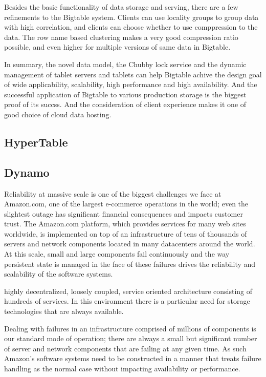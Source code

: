 \documentclass[a4paper]{article}
\begin{document}
Besides the basic functionality of data storage and serving, there are
a few refinements to the Bigtable system. Clients can use locality
groups to group data with high correlation, and clients can choose
whether to use comppression to the data. The row name based clustering
makes a very good compression ratio possible, and even higher for
multiple versions of same data in Bigtable. 

In summary, the novel data model, the Chubby lock service and the
dynamic management of tablet servers and tablets can help Bigtable
achive the design goal of wide applicability, scalability, high
performance and high availability. And the successful application of
Bigtable to various production storage is the biggest proof of its
succss. And the consideration of client experience makes it one of
good choice of cloud data hosting. 

\subsection{HyperTable}

\subsection{Dynamo}
Reliability at massive scale is one of the biggest challenges we face
at Amazon.com, one of the largest e-commerce operations in the world;
even the slightest outage has significant financial consequences and
impacts customer trust. The Amazon.com platform, which provides
services for many web sites worldwide, is implemented on top of an
infrastructure of tens of thousands of servers and network components
located in many datacenters around the world. At this scale, small and
large components fail continuously and the way persistent state is
managed in the face of these failures drives the reliability and
scalability of the software systems. 

highly decentralized, loosely coupled, service
oriented architecture consisting of hundreds of services. In this
environment there is a particular need for storage technologies
that are always available. 

Dealing with failures in an infrastructure comprised of millions of
components is our standard mode of operation; there are always a
small but significant number of server and network components
that are failing at any given time. As such Amazon’s software
systems need to be constructed in a manner that treats failure
handling as the normal case without impacting availability or
performance.
\end{document}

